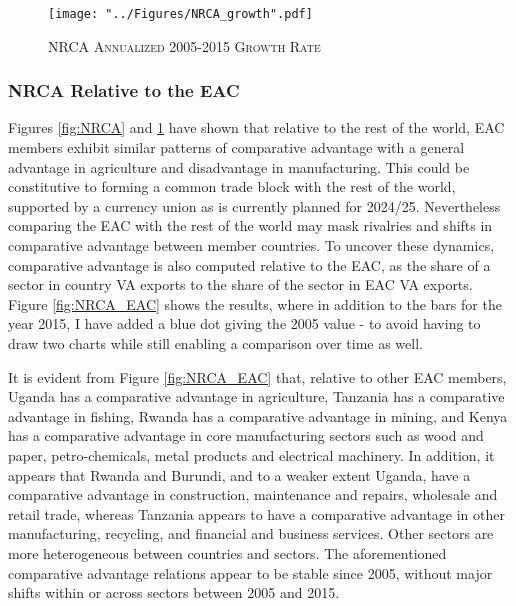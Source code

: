 \documentclass[a4paper]{article}
\begin{document}

\begin{figure}[h!]
\centering
\caption{\label{fig:NRCA_growth}\textsc{NRCA Annualized 2005-2015 Growth Rate}}
\texttt{[image: "../Figures/NRCA\_growth".pdf]} %
\end{figure}
\FloatBarrier



\subsubsection{NRCA Relative to the EAC}
Figures \ref{fig:NRCA} and \ref{fig:NRCA_growth} have shown that relative to the rest of the world, EAC members exhibit similar patterns of comparative advantage with a general advantage in agriculture and disadvantage in manufacturing. This could be constitutive to forming a common trade block with the rest of the world, supported by a currency union as is currently planned for 2024/25. Nevertheless comparing the EAC with the rest of the world may mask rivalries and shifts in comparative advantage between member countries. To uncover these dynamics, comparative advantage is also computed relative to the EAC, as the share of a sector in country VA exports to the share of the sector in EAC VA exports. %
Figure \ref{fig:NRCA_EAC} shows the results, where in addition to the bars for the year 2015, I have added a blue dot giving the 2005 value - to avoid having to draw two charts while still enabling a comparison over time as well. \newline 

It is evident from Figure \ref{fig:NRCA_EAC} that, relative to other EAC members, Uganda has a comparative advantage in agriculture, Tanzania has a comparative advantage in fishing, Rwanda has a comparative advantage in mining, and Kenya has a comparative advantage in core manufacturing sectors such as wood and paper, petro-chemicals, metal products and electrical machinery. In addition, it appears that Rwanda and Burundi, and to a weaker extent Uganda, have a comparative advantage in construction, maintenance and repairs, wholesale and retail trade, whereas Tanzania appears to have a comparative advantage in other manufacturing, recycling, and financial and business services. Other sectors are more heterogeneous between countries and sectors. The aforementioned comparative advantage relations appear to be stable since 2005, without major shifts within or across sectors between 2005 and 2015. 
\end{document}
